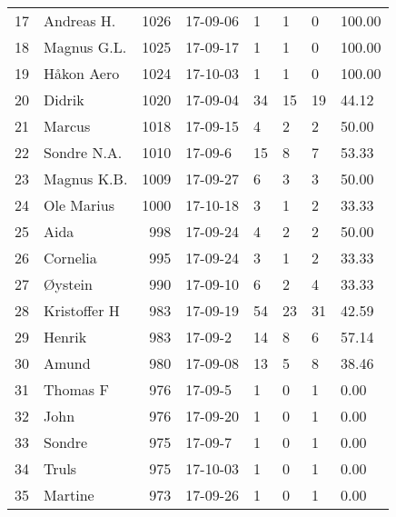 \begin{longtable}{|r|l|r|l|l|l|l|l|}
17 &           Andreas H. &  1026 &    17-09-06 &               1 &     1 &       0 &    100.00 \\
18 &          Magnus G.L. &  1025 &    17-09-17 &               1 &     1 &       0 &    100.00 \\
19 &           Håkon Aero &  1024 &    17-10-03 &               1 &     1 &       0 &    100.00 \\
20 &               Didrik &  1020 &    17-09-04 &              34 &    15 &      19 &     44.12 \\
21 &               Marcus &  1018 &    17-09-15 &               4 &     2 &       2 &     50.00 \\
22 &          Sondre N.A. &  1010 &     17-09-6 &              15 &     8 &       7 &     53.33 \\
23 &          Magnus K.B. &  1009 &    17-09-27 &               6 &     3 &       3 &     50.00 \\
24 &           Ole Marius &  1000 &    17-10-18 &               3 &     1 &       2 &     33.33 \\
25 &                 Aida &   998 &    17-09-24 &               4 &     2 &       2 &     50.00 \\
26 &             Cornelia &   995 &    17-09-24 &               3 &     1 &       2 &     33.33 \\
27 &              Øystein &   990 &    17-09-10 &               6 &     2 &       4 &     33.33 \\
28 &         Kristoffer H &   983 &    17-09-19 &              54 &    23 &      31 &     42.59 \\
29 &               Henrik &   983 &     17-09-2 &              14 &     8 &       6 &     57.14 \\
30 &                Amund &   980 &    17-09-08 &              13 &     5 &       8 &     38.46 \\
31 &             Thomas F &   976 &     17-09-5 &               1 &     0 &       1 &      0.00 \\
32 &                 John &   976 &    17-09-20 &               1 &     0 &       1 &      0.00 \\
33 &               Sondre &   975 &     17-09-7 &               1 &     0 &       1 &      0.00 \\
34 &                Truls &   975 &    17-10-03 &               1 &     0 &       1 &      0.00 \\
35 &              Martine &   973 &    17-09-26 &               1 &     0 &       1 &      0.00 \\

\end{longtable}
